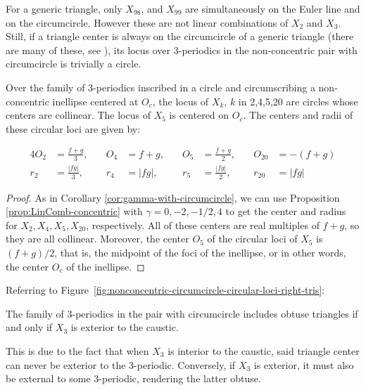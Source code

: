 \begin{observation}
For a generic triangle, only $X_{98}$, and $X_{99}$ are simultaneously on the Euler line and on the circumcircle. However these are not linear combinations of $X_2$ and $X_3$. Still, if a triangle center is always on the circumcircle of a generic triangle (there are many of these, see \cite[Circumcircle]{mw}), its locus over 3-periodics in the non-concentric pair with circumcircle is trivially a circle.
\end{observation}

 
\begin{corollary}
 Over the family of 3-periodics inscribed in a circle and circumscribing a non-concentric inellipse centered at $O_c$, the locus of $X_k$, $k$ in 2,4,5,20 are circles whose centers are collinear. The locus of $X_5$ is centered on $O_c$. The centers and radii of these circular loci are given by:

\begin{alignat*}{4}
    O_2&=\frac{f+g}{3},\quad& O_4&=f+g,\quad&O_5&=\frac{f+g}{2},\quad&O_{20}&=-(f+g)\\
    r_2&=\frac{|f g|}{3},\quad&r_4 &= |f g|,\quad&r_5 &= \frac{|f g|}{2},\quad& r_{20}&= |f g|
\end{alignat*}

\end{corollary}

\begin{proof}
As in Corollary \ref{cor:gamma-with-circumcircle}, we can use Proposition \ref{prop:LinComb-concentric} with $\gamma=0,-2,-1/2,4$ to get the center and radius for $X_2,X_4,X_5,X_{20}$, respectively. All of these centers are real multiples of $f+g$, so they are all collinear. Moreover, the center $O_5$ of the circular loci of $X_5$ is $(f+g)/2$, that is, the midpoint of the foci of the inellipse, or in other words, the center $O_c$ of the inellipse.
\end{proof}
 
Referring to Figure~\ref{fig:nonconcentric-circumcircle-circular-loci-right-tris}:

\begin{observation}
The family of 3-periodics in the pair with circumcircle includes obtuse triangles if and only if $X_3$ is exterior to the caustic. \end{observation}

This is due to the fact that when $X_3$ is interior to the caustic, said triangle center can never be exterior to the 3-periodic. Conversely, if $X_3$ is exterior, it must also be external to some 3-periodic, rendering the latter obtuse.

